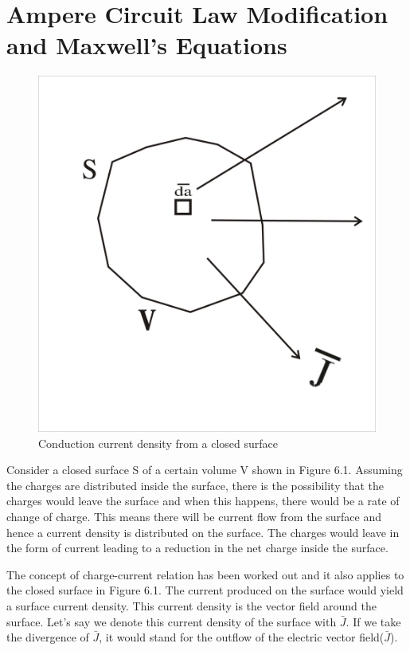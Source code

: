 \section{Ampere Circuit Law Modification and Maxwell's Equations}
\begin{figure}[h]
	\centering
	\includegraphics[width=.7\linewidth]{graphics/closedsurface}
	\caption{Conduction current density from a closed surface}
\end{figure}

Consider a closed surface S of a certain volume V shown in Figure 6.1. Assuming the charges are distributed inside the surface, there is the possibility that the charges would leave the surface and when this happens, there would be a rate of change of charge. This means there will be current flow from the surface and hence a current density is distributed on the surface. The charges would leave in the form of current leading to a reduction in the net charge inside the surface.

The concept of charge-current relation has been worked out and it also applies to the closed surface in Figure 6.1. The current produced on the surface would yield a surface current density. This current density is the vector field around the surface. Let's say we denote this current density of the surface with $\bar{J}$. If we take the divergence of $\bar{J}$, it would stand for the outflow of the electric vector field($\bar{J}$).

